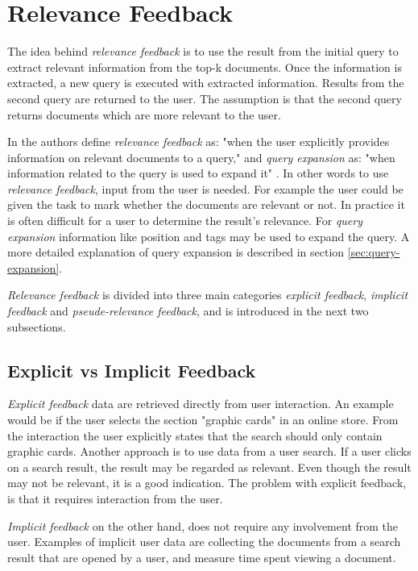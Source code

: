 \section{Relevance Feedback}
The idea behind \textit{relevance feedback} is to use the result from the initial query to extract relevant information from the top-k documents.
Once the information is extracted, a new query is executed with extracted information.
Results from the second query are returned to the user.
The assumption is that the second query returns documents which are more relevant to the user.

In \cite{ir-book} the authors define \textit{relevance feedback} as: "when the user explicitly provides information on relevant documents to a query,"
and \textit{query expansion} as: "when information related to the query is used to expand it" \cite[p. 177]{ir-book}.
In other words to use \textit{relevance feedback}, input from the user is needed.
For example the user could be given the task to mark whether the documents are relevant or not.
In practice it is often difficult for a user to determine the result's relevance.
For \textit{query expansion} information like position and tags may be used to expand the query.
A more detailed explanation of query expansion is described in section \ref{sec:query-expansion}.

\textit{Relevance feedback} is divided into three main categories \textit{explicit feedback}, \textit{implicit feedback} and \textit{pseude-relevance feedback},
and is introduced in the next two subsections.

\subsection{Explicit vs Implicit Feedback}
\textit{Explicit feedback} data are retrieved directly from user interaction.
An example would be if the user selects the section "graphic cards" in an online store.
From the interaction the user explicitly states that the search should only contain graphic cards.
Another approach is to use data from a user search.
If a user clicks on a search result, the result may be regarded as relevant.
Even though the result may not be relevant, it is a good indication.
The problem with explicit feedback, is that it requires interaction from the user.

\textit{Implicit feedback} on the other hand, does not require any involvement from the user.
Examples of implicit user data are collecting the documents from a search result that  are opened by a user,
and measure time spent viewing a document.

